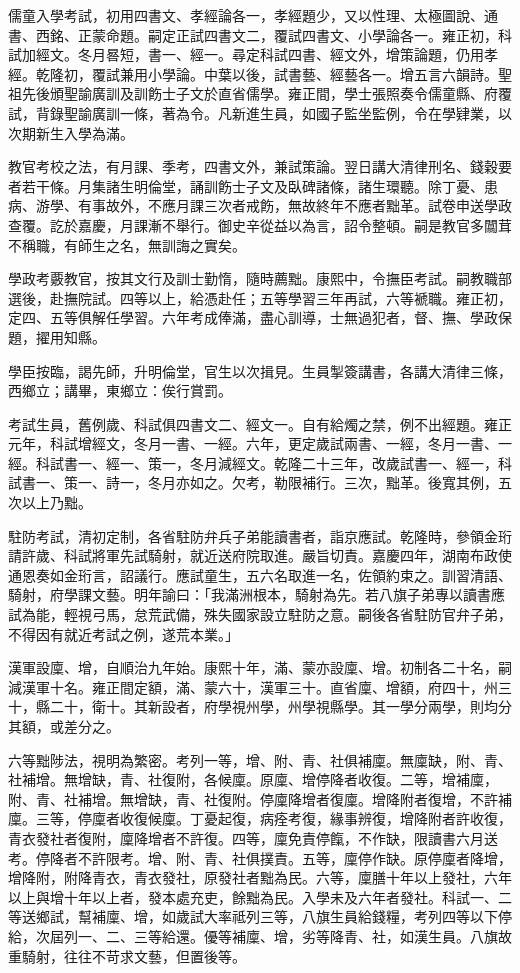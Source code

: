 \begin{pinyinscope}
儒童入學考試，初用四書文、孝經論各一，孝經題少，又以性理、太極圖說、通書、西銘、正蒙命題。嗣定正試四書文二，覆試四書文、小學論各一。雍正初，科試加經文。冬月晷短，書一、經一。尋定科試四書、經文外，增策論題，仍用孝經。乾隆初，覆試兼用小學論。中葉以後，試書藝、經藝各一。增五言六韻詩。聖祖先後頒聖諭廣訓及訓飭士子文於直省儒學。雍正間，學士張照奏令儒童縣、府覆試，背錄聖諭廣訓一條，著為令。凡新進生員，如國子監坐監例，令在學肄業，以次期新生入學為滿。

教官考校之法，有月課、季考，四書文外，兼試策論。翌日講大清律刑名、錢穀要者若干條。月集諸生明倫堂，誦訓飭士子文及臥碑諸條，諸生環聽。除丁憂、患病、游學、有事故外，不應月課三次者戒飭，無故終年不應者黜革。試卷申送學政查覆。訖於嘉慶，月課漸不舉行。御史辛從益以為言，詔令整頓。嗣是教官多闒茸不稱職，有師生之名，無訓誨之實矣。

學政考覈教官，按其文行及訓士勤惰，隨時薦黜。康熙中，令撫臣考試。嗣教職部選後，赴撫院試。四等以上，給憑赴任；五等學習三年再試，六等褫職。雍正初，定四、五等俱解任學習。六年考成俸滿，盡心訓導，士無過犯者，督、撫、學政保題，擢用知縣。

學臣按臨，謁先師，升明倫堂，官生以次揖見。生員掣簽講書，各講大清律三條，西鄉立；講畢，東鄉立：俟行賞罰。

考試生員，舊例歲、科試俱四書文二、經文一。自有給燭之禁，例不出經題。雍正元年，科試增經文，冬月一書、一經。六年，更定歲試兩書、一經，冬月一書、一經。科試書一、經一、策一，冬月減經文。乾隆二十三年，改歲試書一、經一，科試書一、策一、詩一，冬月亦如之。欠考，勒限補行。三次，黜革。後寬其例，五次以上乃黜。

駐防考試，清初定制，各省駐防弁兵子弟能讀書者，詣京應試。乾隆時，參領金珩請許歲、科試將軍先試騎射，就近送府院取進。嚴旨切責。嘉慶四年，湖南布政使通恩奏如金珩言，詔議行。應試童生，五六名取進一名，佐領約束之。訓習清語、騎射，府學課文藝。明年諭曰：「我滿洲根本，騎射為先。若八旗子弟專以讀書應試為能，輕視弓馬，怠荒武備，殊失國家設立駐防之意。嗣後各省駐防官弁子弟，不得因有就近考試之例，遂荒本業。」

漢軍設廩、增，自順治九年始。康熙十年，滿、蒙亦設廩、增。初制各二十名，嗣減漢軍十名。雍正間定額，滿、蒙六十，漢軍三十。直省廩、增額，府四十，州三十，縣二十，衛十。其新設者，府學視州學，州學視縣學。其一學分兩學，則均分其額，或差分之。

六等黜陟法，視明為繁密。考列一等，增、附、青、社俱補廩。無廩缺，附、青、社補增。無增缺，青、社復附，各候廩。原廩、增停降者收復。二等，增補廩，附、青、社補增。無增缺，青、社復附。停廩降增者復廩。增降附者復增，不許補廩。三等，停廩者收復候廩。丁憂起復，病痊考復，緣事辨復，增降附者許收復，青衣發社者復附，廩降增者不許復。四等，廩免責停餼，不作缺，限讀書六月送考。停降者不許限考。增、附、青、社俱撲責。五等，廩停作缺。原停廩者降增，增降附，附降青衣，青衣發社，原發社者黜為民。六等，廩膳十年以上發社，六年以上與增十年以上者，發本處充吏，餘黜為民。入學未及六年者發社。科試一、二等送鄉試，幫補廩、增，如歲試大率祗列三等，八旗生員給錢糧，考列四等以下停給，次屆列一、二、三等給還。優等補廩、增，劣等降青、社，如漢生員。八旗故重騎射，往往不苛求文藝，但置後等。


\end{pinyinscope}
